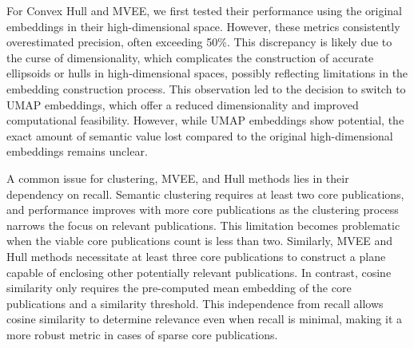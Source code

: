 For Convex Hull and MVEE, we first tested their performance using the original embeddings in their high-dimensional space. However, these metrics consistently overestimated precision, often exceeding 50\%. This discrepancy is likely due to the curse of dimensionality, which complicates the construction of accurate ellipsoids or hulls in high-dimensional spaces, possibly reflecting limitations in the embedding construction process. This observation led to the decision to switch to UMAP embeddings, which offer a reduced dimensionality and improved computational feasibility. However, while UMAP embeddings show potential, the exact amount of semantic value lost compared to the original high-dimensional embeddings remains unclear.

A common issue for clustering, MVEE, and Hull methods lies in their dependency on recall. Semantic clustering requires at least two core publications, and performance improves with more core publications as the clustering process narrows the focus on relevant publications. This limitation becomes problematic when the viable core publications count is less than two. Similarly, MVEE and Hull methods necessitate at least three core publications to construct a plane capable of enclosing other potentially relevant publications. In contrast, cosine similarity only requires the pre-computed mean embedding of the core publications and a similarity threshold. This independence from recall allows cosine similarity to determine relevance even when recall is minimal, making it a more robust metric in cases of sparse core publications.





